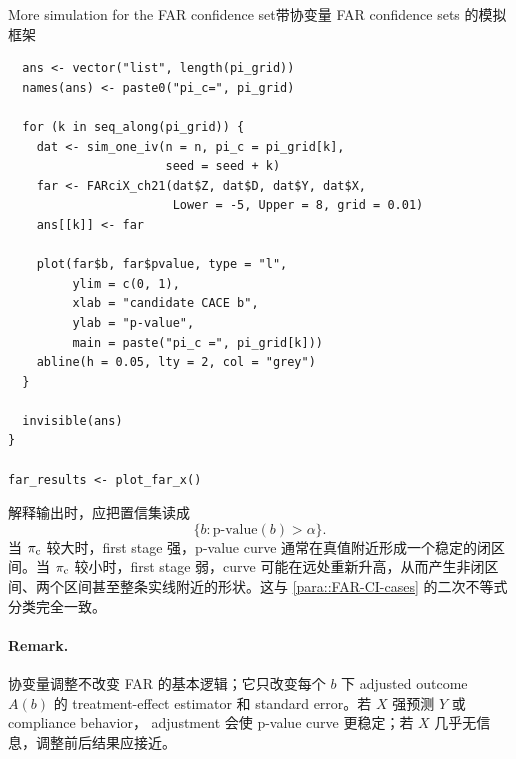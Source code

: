 \begin{exercisesolution}{More simulation for the FAR confidence set}{带协变量 FAR confidence sets 的模拟框架}
\begin{lstlisting}
  ans <- vector("list", length(pi_grid))
  names(ans) <- paste0("pi_c=", pi_grid)

  for (k in seq_along(pi_grid)) {
    dat <- sim_one_iv(n = n, pi_c = pi_grid[k],
                      seed = seed + k)
    far <- FARciX_ch21(dat$Z, dat$D, dat$Y, dat$X,
                       Lower = -5, Upper = 8, grid = 0.01)
    ans[[k]] <- far

    plot(far$b, far$pvalue, type = "l",
         ylim = c(0, 1),
         xlab = "candidate CACE b",
         ylab = "p-value",
         main = paste("pi_c =", pi_grid[k]))
    abline(h = 0.05, lty = 2, col = "grey")
  }

  invisible(ans)
}

far_results <- plot_far_x()
\end{lstlisting}

解释输出时，应把置信集读成
\[
\{b:\text{p-value}(b)>\alpha\}.
\]
当 $\pi_{\textup{c}}$ 较大时，first stage 强，p-value curve 通常在真值附近形成一个稳定的闭区间。当 $\pi_{\textup{c}}$ 较小时，first stage 弱，curve 可能在远处重新升高，从而产生非闭区间、两个区间甚至整条实线附近的形状。这与 \cref{para::FAR-CI-cases} 的二次不等式分类完全一致。

\paragraph{Remark.}
协变量调整不改变 FAR 的基本逻辑；它只改变每个 $b$ 下 adjusted outcome $A(b)$ 的 treatment-effect estimator 和 standard error。若 $X$ 强预测 $Y$ 或 compliance behavior，\citet{lin2013} adjustment 会使 p-value curve 更稳定；若 $X$ 几乎无信息，调整前后结果应接近。
\end{exercisesolution}

